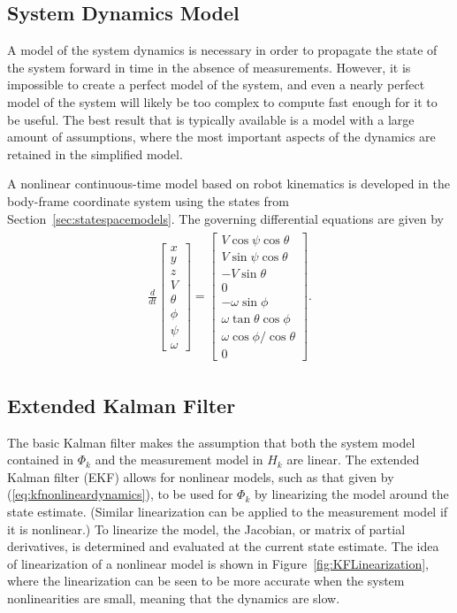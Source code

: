 \subsection{System Dynamics Model}%
\label{sec:dynamics}
A model of the system dynamics is necessary in order to propagate the state of the system forward in time in the absence of measurements.
However, it is impossible to create a perfect model of the system, and even a nearly perfect model of the system will likely be too complex to compute fast enough for it to be useful.
The best result that is typically available is a model with a large amount of assumptions, where the most important aspects of the dynamics are retained in the simplified model.

A nonlinear continuous-time model based on robot kinematics is developed in the body-frame coordinate system using the states from Section~\ref{sec:statespacemodels}.
The governing differential equations are given by
\begin{align}
\label{eq:kfnonlineardynamics}
\begin{split}
\frac{d}{dt}\left[\begin{array}{c}
x \\ y \\ z \\ V \\ \theta \\ \phi \\ \psi \\ \omega
\end{array}\right] =
\left[\begin{array}{c}
V\cos\psi\cos\theta \\
V\sin\psi\cos\theta \\
-V\sin\theta \\
0 \\
-\omega\sin\phi \\
\omega\tan\theta\cos\phi \\
\omega\cos\phi/\cos\theta \\
0
\end{array}\right].
\end{split}
\end{align}

\subsection{Extended Kalman Filter}%
\label{sec:extendedkf}
The basic Kalman filter makes the assumption that both the system model contained in $\Phi_k$ and the measurement model in $H_k$ are linear.
The extended Kalman filter (EKF) allows for nonlinear models, such as that given by (\ref{eq:kfnonlineardynamics}), to be used for $\Phi_k$ by linearizing the model around the state estimate.
(Similar linearization can be applied to the measurement model if it is nonlinear.)
To linearize the model, the Jacobian, or matrix of partial derivatives, is determined and evaluated at the current state estimate.
The idea of linearization of a nonlinear model is shown in Figure~\ref{fig:KFLinearization}, where the linearization can be seen to be more accurate when the system nonlinearities are small, meaning that the dynamics are slow.

